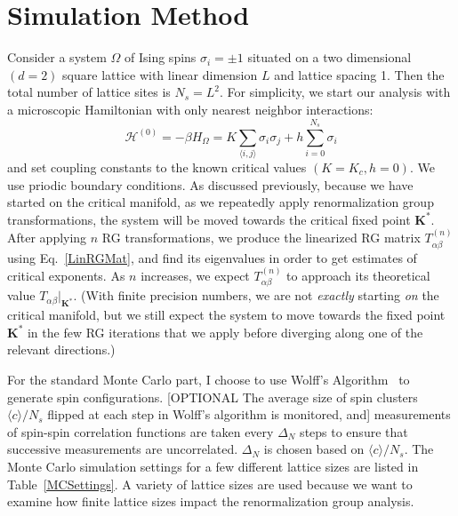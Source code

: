 \documentclass{article}
\renewcommand{\vec}[1]{\mathbf{#1}}
\begin{document}
\section{Simulation Method}
Consider a system $\Omega$ of Ising spins $\sigma_i = \pm 1$ situated on a two dimensional $(d = 2)$ square lattice with linear dimension $L$ and lattice spacing 1. Then the total number of lattice sites is $N_s = L^2$. For simplicity, we start our analysis with a microscopic Hamiltonian with only nearest neighbor interactions:
\begin{equation}
\mathcal{H^{(0)}} = -\beta H_\Omega = K\sum_{\langle i,j\rangle} \sigma_i \sigma_j + h\sum_{i = 0}^{N_s} \sigma_i
\end{equation}
and set coupling constants to the known critical values $(K = K_c, h = 0)$. We use priodic boundary conditions. As discussed previously, because we have started on the critical manifold, as we repeatedly apply renormalization group transformations, the system will be moved towards the critical fixed point $\vec{K^*}$. After applying $n$ RG transformations, we produce the linearized RG matrix $T_{\alpha\beta}^{(n)}$ using Eq.~\ref{LinRGMat}, and find its eigenvalues in order to get estimates of critical exponents. As $n$ increases, we expect $T_{\alpha\beta}^{(n)}$ to approach its theoretical value $T_{\alpha\beta}|_{\vec{K^*}}$. (With finite precision numbers, we are not \textit{exactly} starting \textit{on} the critical manifold, but we still expect the system to move towards the fixed point $\vec{K^*}$ in the few RG iterations that we apply before diverging along one of the relevant directions.) 

For the standard Monte Carlo part, I choose to use Wolff's Algorithm~\cite{Wolff1989} to generate spin configurations. [OPTIONAL The average size of spin clusters $\langle c \rangle / N_s$ flipped at each step in Wolff's algorithm is monitored, and] measurements of spin-spin correlation functions are taken every $\Delta_N$ steps to ensure that successive measurements are uncorrelated. $\Delta_N$ is chosen based on $\langle c \rangle / N_s$. The Monte Carlo simulation settings for a few different lattice sizes are listed in Table~\ref{MCSettings}. A variety of lattice sizes are used because we want to examine how finite lattice sizes impact the renormalization group analysis.
\end{document}
